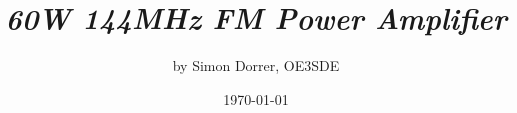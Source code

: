 \title{\emph{60W 144MHz FM Power Amplifier}}	%
\author{by Simon Dorrer, OE3SDE}				%
\date{\today}									%